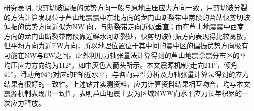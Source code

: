 研究表明, 快剪切波偏振的优势方向一般与原地主压应力方向一致\citep{Gao2011,Gao2012}，用剪切波分裂的方法计算发现位于芦山地震震中东北方向的龙门山断裂带中南段的台站快剪切波偏振的优势方向近似为NW 向，与断裂带走向近似垂直；而在芦山地震震中西南方向的龙门山断裂带南段靠近鲜水河断裂处，快剪切波偏振方向表现得比较离散，但平均方向为近EW方向，所以地理位置位于其中间的震中区的偏振优势方向极有可能在NW与EW之间。此外利用力轴张量法计算得到的芦山地震余震分布区的平均压应力方向约为112°，如中灰色大箭头所示。本文震源机制(走向211°，倾角41°，滑动角94°)对应的P轴近水平，与各向异性分析及力轴张量计算法得到的应力结果有很好的一致性。上述钻井实测资料，应力计算资料结果相互吻合，均与本文震源机制表现出一致性，表明芦山地震主要为区域NWW向水平应力长年积累的一次应力释放。
